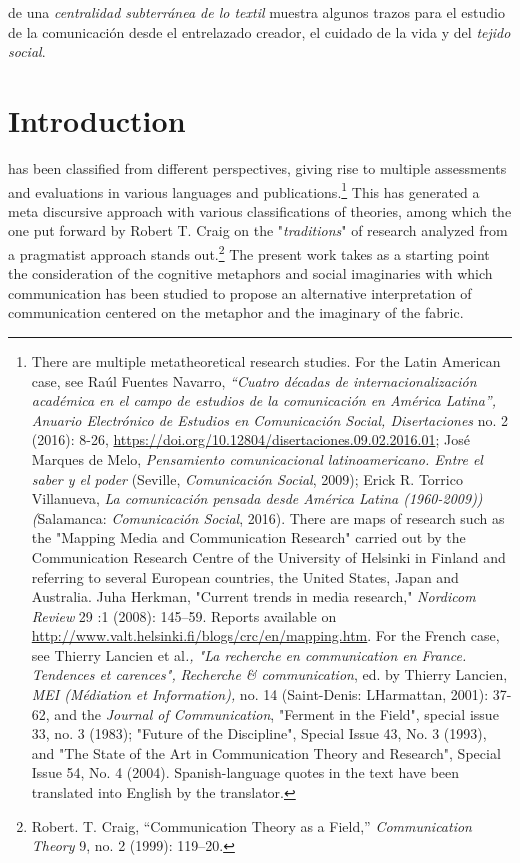 \documentclass{tufte-handout}
\begin{document}
\noindent de una \emph{centralidad subterránea de lo textil} muestra
algunos trazos para el estudio de la comunicación desde el entrelazado
creador, el cuidado de la vida y del \emph{tejido social}.

\vspace*{2em}


\hypertarget{introduction}{%
\section{Introduction}\label{introduction}}

 has been classified from different
perspectives, giving rise to multiple assessments and evaluations in
various languages and publications.\footnote{There are multiple
  metatheoretical research studies. For the Latin American case, see
  Raúl Fuentes Navarro, \emph{``Cuatro décadas de internacionalización
  académica en el campo de estudios de la comunicación en América
  Latina'',} \emph{Anuario Electrónico de Estudios en Comunicación
  Social, Disertaciones} no. 2 (2016): 8-26,
  \url{https://doi.org/10.12804/disertaciones.09.02.2016.01}; José
  Marques de Melo, \emph{Pensamiento comunicacional latinoamericano.
  Entre el saber y el poder} (Seville, \emph{Comunicación Social},
  2009); Erick R. Torrico Villanueva, \emph{La comunicación pensada
  desde América Latina (1960-2009)) (}Salamanca: \emph{Comunicación
  Social}, 2016). There are maps of research such as the "Mapping Media
  and Communication Research" carried out by the Communication Research
  Centre of the University of Helsinki in Finland and referring to
  several European countries, the United States, Japan and Australia.
  Juha Herkman, "Current trends in media research," \emph{Nordicom
  Review} 29 :1 (2008): 145--59. Reports available on
  \url{http://www.valt.helsinki.fi/blogs/crc/en/mapping.htm}. For the
  French case, see Thierry Lancien et al\emph{., "La recherche en
  communication en France. Tendences et carences",} \emph{Recherche \&
  communication}, ed. by Thierry Lancien, \emph{MEI (Médiation et
  Information),} no. 14 (Saint-Denis: L\textquotesingle Harmattan,
  2001): 37-62, and the \emph{Journal of Communication}, "Ferment in the
  Field", special issue 33, no. 3 (1983); "Future of the Discipline",
  Special Issue 43, No. 3 (1993), and "The State of the Art in
  Communication Theory and Research", Special Issue 54, No. 4 (2004). Spanish-language quotes in the text have been translated into English by the translator.} This has generated a meta discursive approach with
various classifications of theories, among which the one put forward by
Robert T. Craig on the "\emph{traditions}" of research analyzed from a
pragmatist approach stands out.\footnote{Robert. T. Craig,
  ``Communication Theory as a Field,'' \emph{Communication Theory} 9,
  no. 2 (1999): 119--20.} The present work takes as a starting point the
consideration of the cognitive metaphors and social imaginaries with
which communication has been studied to propose an alternative
interpretation of communication centered on the metaphor and the
imaginary of the fabric.
\end{document}
